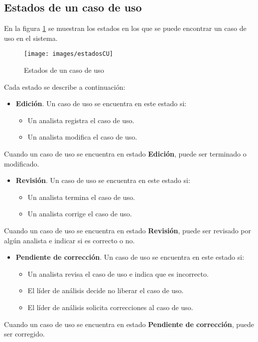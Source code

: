 {{{{\subsection{Estados de un caso de uso}

En la figura \ref{estadosCU} se muestran los estados en los que se puede encontrar un caso de uso en el sistema.

	\begin{figure}[H]
		\texttt{[image: images/estadosCU]}
		\caption{Estados de un caso de uso}
		\label{estadosCU}
	\end{figure}

	Cada estado se describe a continuación:
	\begin{itemize}
		\item \textbf{Edición}. Un caso de uso se encuentra en este estado si:
			\begin{itemize}
				\item Un analista registra el caso de uso.
				\item Un analista modifica el caso de uso.
			\end{itemize}
	\end{itemize}
	Cuando un caso de uso se encuentra en estado \textbf{Edición}, puede ser terminado o modificado.
	
	\begin{itemize}
		\item \textbf{Revisión}. Un caso de uso se encuentra en este estado si:
		\begin{itemize}
			\item Un analista termina el caso de uso.
			\item Un analista corrige el caso de uso.
		\end{itemize}
	\end{itemize}
	Cuando un caso de uso se encuentra en estado \textbf{Revisión}, puede ser revisado por algún analista e indicar si es correcto o no.
	
	\begin{itemize}
		\item \textbf{Pendiente de corrección}. Un caso de uso se encuentra en este estado si:
		\begin{itemize}
			\item Un analista revisa el caso de uso e indica que es incorrecto.
			\item El líder de análisis decide no liberar el caso de uso.
			\item El líder de análisis solicita correcciones al caso de uso.
		\end{itemize}
	\end{itemize}
	Cuando un caso de uso se encuentra en estado \textbf{Pendiente de corrección}, puede ser corregido.
	
}}}}
